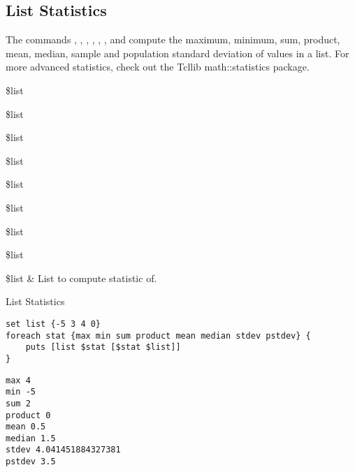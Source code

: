 \documentclass{article}
\begin{document}
\subsection{List Statistics}
The commands , , , , , ,  and  compute the maximum, minimum, sum, product, mean, median, sample and population standard deviation of values in a list.
For more advanced statistics, check out the Tcllib math::statistics package.
\begin{syntax}
 \$list 
\end{syntax}
\begin{syntax}
 \$list 
\end{syntax}
\begin{syntax}
 \$list
\end{syntax}
\begin{syntax}
 \$list
\end{syntax}
\begin{syntax}
 \$list 
\end{syntax}
\begin{syntax}
 \$list 
\end{syntax}
\begin{syntax}
 \$list
\end{syntax}
\begin{syntax}
 \$list
\end{syntax}
\begin{args}
\$list & List to compute statistic of. \\
\end{args}
\begin{example}{List Statistics}
\begin{lstlisting}
set list {-5 3 4 0}
foreach stat {max min sum product mean median stdev pstdev} {
    puts [list $stat [$stat $list]]
}
\end{lstlisting}
\tcblower
\begin{lstlisting}
max 4
min -5
sum 2
product 0
mean 0.5
median 1.5
stdev 4.041451884327381
pstdev 3.5
\end{lstlisting}
\end{example}
\clearpage
\end{document}
